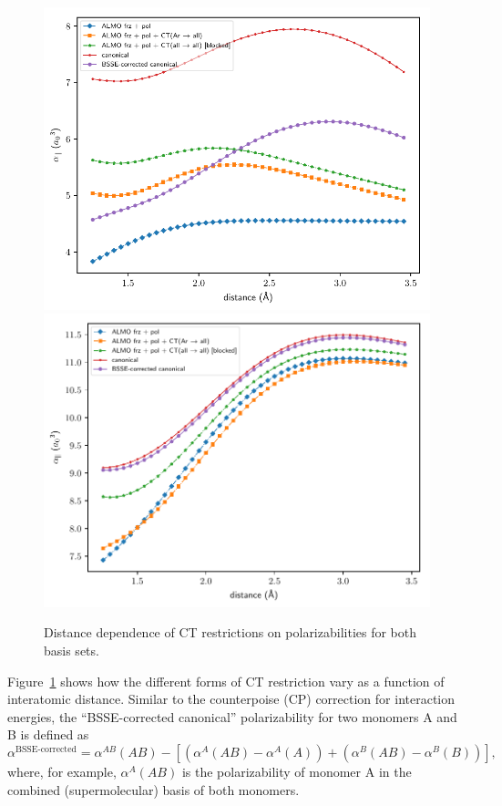 \begin{figure}
  \centering
  \includegraphics[scale=0.90]{paper_04/almo_vs_bsse_canonical_onaxis_projected_short_def2-SVP.pdf}
  \includegraphics[scale=0.90]{paper_04/almo_vs_bsse_canonical_onaxis_projected_short_def2-SVPD.pdf}
  \caption[Distance dependence of CT restrictions on polarizabilities]{Distance dependence of CT restrictions on polarizabilities for both basis sets.}
  \label{fig:distance-dependence-ct-levels}
\end{figure}

Figure~\ref{fig:distance-dependence-ct-levels} shows how the different forms of CT restriction vary as a function of interatomic distance. Similar to the counterpoise (CP) correction for interaction energies, the ``BSSE-corrected canonical'' polarizability for two monomers A and B is defined as
\begin{equation}
  \alpha^{\text{BSSE-corrected}} = \alpha^{AB}(AB) - \left[ \left( \alpha^{A}(AB) - \alpha^{A}(A) \right) + \left( \alpha^{B}(AB) - \alpha^{B}(B) \right) \right],
  \label{eq:bsse-corrected-polarizability}
\end{equation}
where, for example, \(\alpha^{A}(AB)\) is the polarizability of monomer A in the combined (supermolecular) basis of both monomers.

